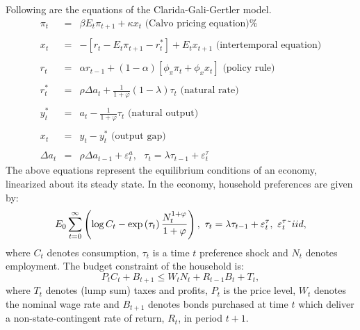 \documentclass[12pt,thmsa]{article}
\begin{document}
Following are the equations of the Clarida-Gali-Gertler model. 
\begin{eqnarray*}
\pi _{t} &=&\beta E_{t}\pi _{t+1}+\kappa x_{t}\text{ (Calvo pricing equation)%
} \\
&& \\
x_{t} &=&-\left[ r_{t}-E_{t}\pi _{t+1}-r_{t}^{\ast }\right] +E_{t}x_{t+1}%
\text{ (intertemporal equation)} \\
&& \\
r_{t} &=&\alpha r_{t-1}+(1-\alpha )\left[ \phi _{\pi }\pi _{t}+\phi _{x}x_{t}%
\right] \text{ (policy rule)} \\
&& \\
r_{t}^{\ast } &=&\rho \Delta a_{t}+\frac{1}{1+\varphi }\left( 1-\lambda
\right) \tau _{t}\text{ (natural rate)} \\
&& \\
y_{t}^{\ast } &=&a_{t}-\frac{1}{1+\varphi }\tau _{t}\text{ (natural output)}
\\
&& \\
x_{t} &=&y_{t}-y_{t}^{\ast }\text{ (output gap)} \\
&& \\
\Delta a_{t} &=&\rho \Delta a_{t-1}+\varepsilon _{t}^{a},\text{ }\tau
_{t}=\lambda \tau _{t-1}+\varepsilon _{t}^{\tau }
\end{eqnarray*}%
The above equations represent the equilibrium conditions of an economy,
linearized about its steady state. In the economy, household preferences are
given by:%
\begin{equation*}
E_{0}\sum_{t=0}^{\infty }\left( \log C_{t}-\exp \left( \tau _{t}\right) 
\frac{N_{t}^{1+\varphi }}{1+\varphi }\right) ,\text{ }\tau _{t}=\lambda \tau
_{t-1}+\varepsilon _{t}^{\tau },\text{ }\varepsilon _{t}^{\tau }\symbol{126}%
iid,
\end{equation*}%
where $C_{t}$ denotes consumption, $\tau _{t}$ is a time $t$ preference
shock and $N_{t}$ denotes employment. The budget constraint of the household
is:%
\begin{equation*}
P_{t}C_{t}+B_{t+1}\leq W_{t}N_{t}+R_{t-1}B_{t}+T_{t},
\end{equation*}%
where $T_{t}$ denotes (lump sum) taxes and profits, $P_{t}$ is the price
level, $W_{t}$ denotes the nominal wage rate and $B_{t+1}$ denotes bonds
purchased at time $t$ which deliver a non-state-contingent rate of return, $%
R_{t}$, in period $t+1.$
\end{document}
